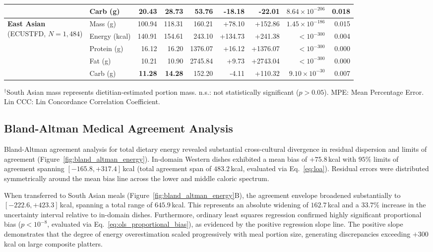 \documentclass[utf8]{FrontiersinVancouver}
\begin{document}
\begin{table}[tbp]
{\begin{tabular}{llrrrrrrr}
 & Carb (g)          & 20.43  & 28.73  & \textbf{53.76}  & -18.18 & \textbf{-22.01} & $8.64 \times 10^{-206}$ & 0.018 \\
\midrule
\multirow{5}{*}{\parbox{2.8cm}{\textbf{East Asian}\\(ECUSTFD, $N=1,484$)}} 
 & Mass (g)          & 100.94 & 118.31 & 160.21 & +78.10  & +152.86 & $1.45 \times 10^{-186}$ & 0.015 \\
 & Energy (kcal)     & 140.91 & 154.61 & 243.10 & +134.73 & +241.38 & $< 10^{-300}$           & 0.004 \\
 & Protein (g)       & 16.12  & 16.20  & 1376.07& +16.12  & +1376.07& $< 10^{-300}$           & 0.000 \\
 & Fat (g)           & 10.21  & 10.90  & 2745.84& +9.73   & +2743.04& $< 10^{-300}$           & 0.000 \\
 & Carb (g)          & \textbf{11.28}  & \textbf{14.28}  & 152.20 & -4.11   & +110.32 & $9.10 \times 10^{-30}$  & 0.007 \\
\bottomrule
\end{tabular}
}
\vspace{2pt}
\flushleft
\scriptsize{$^\dagger$South Asian mass represents dietitian-estimated portion mass. n.s.: not statistically significant ($p > 0.05$). MPE: Mean Percentage Error. Lin CCC: Lin Concordance Correlation Coefficient.}
\end{table}

\subsection{Bland-Altman Medical Agreement Analysis}

Bland-Altman agreement analysis for total dietary energy revealed substantial cross-cultural divergence in residual dispersion and limits of agreement (Figure~\ref{fig:bland_altman_energy}). In-domain Western dishes exhibited a mean bias of $+75.8$\,kcal with $95\%$ limits of agreement spanning $[-165.8, +317.4]$\,kcal (total agreement span of $483.2$\,kcal, evaluated via Eq.~\ref{eq:loa}). Residual errors were distributed symmetrically around the mean bias line across the lower and middle caloric spectrum.

When transferred to South Asian meals (Figure~\ref{fig:bland_altman_energy}B), the agreement envelope broadened substantially to $[-222.6, +423.3]$\,kcal, spanning a total range of $645.9$\,kcal. This represents an absolute widening of $162.7$\,kcal and a $33.7\%$ increase in the uncertainty interval relative to in-domain dishes. Furthermore, ordinary least squares regression confirmed highly significant proportional bias ($p < 10^{-8}$, evaluated via Eq.~\ref{eq:ols_proportional_bias}), as evidenced by the positive regression slope line. The positive slope demonstrates that the degree of energy overestimation scaled progressively with meal portion size, generating discrepancies exceeding $+300$\,kcal on large composite platters.
\end{document}
